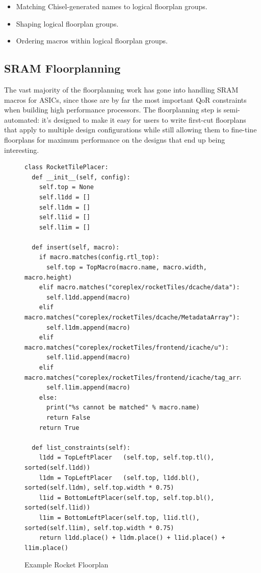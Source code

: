 \documentclass{article}
\begin{document}
\begin{itemize}
\item Matching Chisel-generated names to logical floorplan groups.
\item Shaping logical floorplan groups.
\item Ordering macros within logical floorplan groups.
\end{itemize}

\subsection{SRAM Floorplanning}

The vast majority of the floorplanning work has gone into handling SRAM macros
for ASICs, since those are by far the most important QoR constraints when
building high performance processors.  The floorplanning step is
semi-automated: it's designed to make it easy for users to write first-cut
floorplans that apply to multiple design configurations while still allowing
them to fine-tine floorplans for maximum performance on the designs that end up
being interesting.

\begin{figure}
  \begin{verbatim}
class RocketTilePlacer:
  def __init__(self, config):
    self.top = None
    self.l1dd = []
    self.l1dm = []
    self.l1id = []
    self.l1im = []

  def insert(self, macro):
    if macro.matches(config.rtl_top):
      self.top = TopMacro(macro.name, macro.width, macro.height)
    elif macro.matches("coreplex/rocketTiles/dcache/data"):
      self.l1dd.append(macro)
    elif macro.matches("coreplex/rocketTiles/dcache/MetadataArray"):
      self.l1dm.append(macro)
    elif macro.matches("coreplex/rocketTiles/frontend/icache/u"):
      self.l1id.append(macro)
    elif macro.matches("coreplex/rocketTiles/frontend/icache/tag_array/tag_array"):
      self.l1im.append(macro)
    else:
      print("%s cannot be matched" % macro.name)
      return False
    return True

  def list_constraints(self):
    l1dd = TopLeftPlacer   (self.top, self.top.tl(), sorted(self.l1dd))
    l1dm = TopLeftPlacer   (self.top, l1dd.bl(),     sorted(self.l1dm), self.top.width * 0.75)
    l1id = BottomLeftPlacer(self.top, self.top.bl(), sorted(self.l1id))
    l1im = BottomLeftPlacer(self.top, l1id.tl(),     sorted(self.l1im), self.top.width * 0.75)
    return l1dd.place() + l1dm.place() + l1id.place() + l1im.place()
\end{verbatim}

  \caption{Example Rocket Floorplan}
  \label{impl:example-floorplan}
\end{figure}
\end{document}
